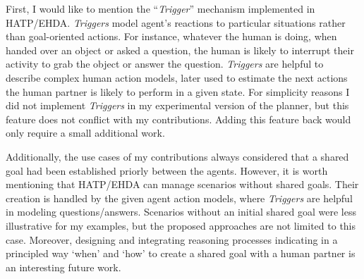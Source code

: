 First, I would like to mention the ``\textit{Trigger}'' mechanism implemented in HATP/EHDA. \textit{Triggers} model agent's reactions to particular situations rather than goal-oriented actions. For instance, whatever the human is doing, when handed over an object or asked a question, the human is likely to interrupt their activity to grab the object or answer the question. \textit{Triggers} are helpful to describe complex human action models, later used to estimate the next actions the human partner is likely to perform in a given state. For simplicity reasons I did not implement \textit{Triggers} in my experimental version of the planner, but this feature does not conflict with my contributions. Adding this feature back would only require a small additional work.

Additionally, the use cases of my contributions always considered that a shared goal had been established priorly between the agents. However, it is worth mentioning that HATP/EHDA can manage scenarios without shared goals. Their creation is handled by the given agent action models, where \textit{Triggers} are helpful in modeling questions/answers. Scenarios without an initial shared goal were less illustrative for my examples, but the proposed approaches are not limited to this case. Moreover, designing and integrating reasoning processes indicating in a principled way `when' and `how' to create a shared goal with a human partner is an interesting future work.



